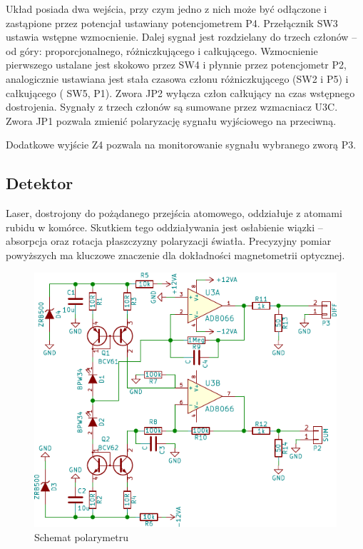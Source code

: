\documentclass[a4paper,10pt]{article}
\begin{document}
Układ posiada dwa wejścia, przy czym jedno z nich może być odłączone i zastąpione przez potencjał ustawiany potencjometrem P4. Przełącznik SW3 ustawia wstępne wzmocnienie.
Dalej sygnał jest rozdzielany do trzech członów -- od góry: proporcjonalnego, różniczkującego i całkującego.
Wzmocnienie pierwszego ustalane jest skokowo przez SW4 i płynnie przez potencjometr P2, analogicznie ustawiana jest stała czasowa członu różniczkującego (SW2 i P5) i całkującego ( SW5, P1). Zwora JP2 wyłącza człon całkujący na czas wstępnego dostrojenia.
Sygnały z trzech członów są sumowane przez wzmacniacz U3C. Zwora JP1 pozwala zmienić polaryzację sygnału wyjściowego na przeciwną.

Dodatkowe wyjście Z4 pozwala na monitorowanie sygnału wybranego zworą P3.

\subsection{Detektor}

Laser, dostrojony do pożądanego przejścia atomowego, oddziałuje z atomami rubidu w komórce.
Skutkiem tego oddziaływania jest osłabienie wiązki -- absorpcja oraz rotacja płaszczyzny polaryzacji światła.
Precyzyjny pomiar powyższych ma kluczowe znaczenie dla dokładności magnetometrii optycznej.

\begin{figure}
\begin{center}
 \includegraphics{./obrazki/polarymetr.pdf}
\end{center}
\caption{Schemat polarymetru}
\label{sch-mod}
\end{figure}
\end{document}

